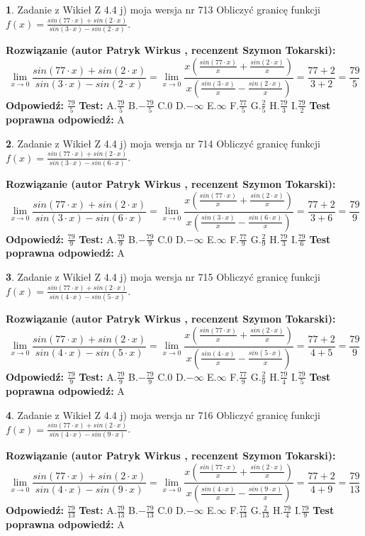 \documentclass[12pt, a4paper]{article}
\theoremstyle{definition} %
\newtheorem{zad}{}
\newcommand{\zadStart}[1]{\begin{zad}#1\newline}
\newcommand{\zadStop}{\end{zad}}
\newcommand{\rozwStart}[2]{\noindent \textbf{Rozwiązanie (autor #1 , recenzent #2): }\newline}
\newcommand{\rozwStop}{\newline}
\newcommand{\odpStart}{\noindent \textbf{Odpowiedź:}\newline}
\newcommand{\odpStop}{\newline}
\newcommand{\testStart}{\noindent \textbf{Test:}\newline}
\newcommand{\testStop}{\newline}
\newcommand{\kluczStart}{\noindent \textbf{Test poprawna odpowiedź:}\newline}
\newcommand{\kluczStop}{\newline}
\begin{document}
\zadStart{Zadanie z Wikieł Z 4.4 j) moja wersja nr 713}
Obliczyć granicę funkcji $f(x)=\frac{sin(77\cdot x) +sin(2\cdot x)}{sin(3\cdot x) -sin(2\cdot x)}$.
\zadStop
\rozwStart{Patryk Wirkus}{Szymon Tokarski}
$$\lim\limits_{x\to 0}\frac{sin(77\cdot x) +sin(2\cdot x)}{sin(3\cdot x) -sin(2\cdot x)}=\lim\limits_{x\to 0}\frac{x(\frac{sin(77\cdot x)}{x}+\frac{sin(2\cdot x)}{x})}{x(\frac{sin(3\cdot x)}{x}-\frac{sin(2\cdot x)}{x})}=\frac{77+2}{3+2} = \frac{79}{5}$$
\rozwStop
\odpStart
$\frac{79}{5}$
\odpStop
\testStart
A.$\frac{79}{5}$
B.$-\frac{79}{5}$
C.$0$
D.$-\infty$
E.$\infty$
F.$\frac{77}{5}$
G.$\frac{2}{5}$
H.$\frac{79}{3}$
I.$\frac{79}{2}$
\testStop
\kluczStart
A
\kluczStop



\zadStart{Zadanie z Wikieł Z 4.4 j) moja wersja nr 714}
Obliczyć granicę funkcji $f(x)=\frac{sin(77\cdot x) +sin(2\cdot x)}{sin(3\cdot x) -sin(6\cdot x)}$.
\zadStop
\rozwStart{Patryk Wirkus}{Szymon Tokarski}
$$\lim\limits_{x\to 0}\frac{sin(77\cdot x) +sin(2\cdot x)}{sin(3\cdot x) -sin(6\cdot x)}=\lim\limits_{x\to 0}\frac{x(\frac{sin(77\cdot x)}{x}+\frac{sin(2\cdot x)}{x})}{x(\frac{sin(3\cdot x)}{x}-\frac{sin(6\cdot x)}{x})}=\frac{77+2}{3+6} = \frac{79}{9}$$
\rozwStop
\odpStart
$\frac{79}{9}$
\odpStop
\testStart
A.$\frac{79}{9}$
B.$-\frac{79}{9}$
C.$0$
D.$-\infty$
E.$\infty$
F.$\frac{77}{9}$
G.$\frac{2}{9}$
H.$\frac{79}{3}$
I.$\frac{79}{6}$
\testStop
\kluczStart
A
\kluczStop



\zadStart{Zadanie z Wikieł Z 4.4 j) moja wersja nr 715}
Obliczyć granicę funkcji $f(x)=\frac{sin(77\cdot x) +sin(2\cdot x)}{sin(4\cdot x) -sin(5\cdot x)}$.
\zadStop
\rozwStart{Patryk Wirkus}{Szymon Tokarski}
$$\lim\limits_{x\to 0}\frac{sin(77\cdot x) +sin(2\cdot x)}{sin(4\cdot x) -sin(5\cdot x)}=\lim\limits_{x\to 0}\frac{x(\frac{sin(77\cdot x)}{x}+\frac{sin(2\cdot x)}{x})}{x(\frac{sin(4\cdot x)}{x}-\frac{sin(5\cdot x)}{x})}=\frac{77+2}{4+5} = \frac{79}{9}$$
\rozwStop
\odpStart
$\frac{79}{9}$
\odpStop
\testStart
A.$\frac{79}{9}$
B.$-\frac{79}{9}$
C.$0$
D.$-\infty$
E.$\infty$
F.$\frac{77}{9}$
G.$\frac{2}{9}$
H.$\frac{79}{4}$
I.$\frac{79}{5}$
\testStop
\kluczStart
A
\kluczStop



\zadStart{Zadanie z Wikieł Z 4.4 j) moja wersja nr 716}
Obliczyć granicę funkcji $f(x)=\frac{sin(77\cdot x) +sin(2\cdot x)}{sin(4\cdot x) -sin(9\cdot x)}$.
\zadStop
\rozwStart{Patryk Wirkus}{Szymon Tokarski}
$$\lim\limits_{x\to 0}\frac{sin(77\cdot x) +sin(2\cdot x)}{sin(4\cdot x) -sin(9\cdot x)}=\lim\limits_{x\to 0}\frac{x(\frac{sin(77\cdot x)}{x}+\frac{sin(2\cdot x)}{x})}{x(\frac{sin(4\cdot x)}{x}-\frac{sin(9\cdot x)}{x})}=\frac{77+2}{4+9} = \frac{79}{13}$$
\rozwStop
\odpStart
$\frac{79}{13}$
\odpStop
\testStart
A.$\frac{79}{13}$
B.$-\frac{79}{13}$
C.$0$
D.$-\infty$
E.$\infty$
F.$\frac{77}{13}$
G.$\frac{2}{13}$
H.$\frac{79}{4}$
I.$\frac{79}{9}$
\testStop
\kluczStart
A
\kluczStop
\end{document}
